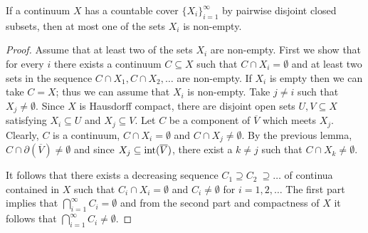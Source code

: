 \begin{thm} If a continuum $X$ has a countable cover $\{X_i\}_{i=1}^{\infty}$ by pairwise disjoint closed subsets, then at most one of the sets $X_i$ is non-empty.
\end{thm}
\begin{proof} Assume that at least two of the sets $X_i$ are non-empty. First we show that for every $i$ there exists a continuum $C \subseteq X$ such that $ C \cap X_i = \emptyset$ and at least two sets in the sequence $C \cap X_1, C \cap X_2, \ldots$ are non-empty. If $X_i$ is empty then we can take $C = X$; thus we can assume that $X_i$ is non-empty. Take $j \ne i$ such that $X_j \ne \emptyset$. Since $X$ is Hausdorff compact, there are disjoint open sets $U,V \subseteq X$ satisfying $X_i \subseteq U$ and $X_j \subseteq V$. Let $C$ be a component of $\overline{V}$ which meets $X_j$. Clearly, $C$ is a continuum, $C \cap X_i = \emptyset$ and $C \cap X_j \ne \emptyset$. By the previous lemma, $C \cap \partial (\overline{V}) \ne \emptyset$ and since $X_j \subseteq \operatorname{int}(\overline{V})$, there exist a $k \ne j$ such that $C \cap X_k \ne \emptyset$.

It follows that there exists a decreasing sequence $C_1 \supseteq C_2 \ \supseteq \ldots$ of continua contained in $X$ such that $C_i \cap X_i = \emptyset$ and $C_i \ne \emptyset$ for $i=1,2, \ldots$ The first part implies that $\bigcap_{i=1}^{\infty} C_i = \emptyset$ and from the second part and compactness of $X$ it follows that $\bigcap_{i=1}^{\infty} C_i \ne \emptyset$.
\end{proof}

